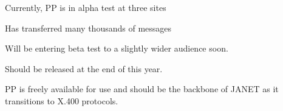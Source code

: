 \begin{bwslide}
\begin{nrtc}

\item	Currently, PP is in alpha test at three sites

\item	Has transferred many thousands of messages

\item	Will be entering beta test to a slightly wider audience soon.

\item	Should be released at the end of this year.

\item	PP is freely available for use and should be the backbone of
	JANET as it transitions to X.400 protocols.
\end{nrtc}
\end{bwslide}


